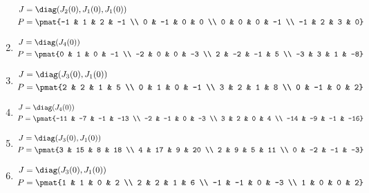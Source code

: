 \begin{enumerate}
\begin{align*}
J &= \diag(J_{2}(0), J_{1}(0), J_{1}(0))\\
P &= \pmat{-1 & 1 & 2 & -1 \\ 0 & -1 & 0 & 0 \\ 0 & 0 & 0 & -1 \\ -1 & 2 & 3 & 0}
\end{align*}

\item

\begin{align*}
J &= \diag(J_{4}(0))\\
P &= \pmat{0 & 1 & 0 & -1 \\ -2 & 0 & 0 & -3 \\ 2 & -2 & -1 & 5 \\ -3 & 3 & 1 & -8}
\end{align*}

\item

\begin{align*}
J &= \diag(J_{3}(0), J_{1}(0))\\
P &= \pmat{2 & 2 & 1 & 5 \\ 0 & 1 & 0 & -1 \\ 3 & 2 & 1 & 8 \\ 0 & -1 & 0 & 2}
\end{align*}

\item

\begin{align*}
J &= \diag(J_{4}(0))\\
P &= \pmat{-11 & -7 & -1 & -13 \\ -2 & -1 & 0 & -3 \\ 3 & 2 & 0 & 4 \\ -14 & -9 & -1 & -16}
\end{align*}

\item

\begin{align*}
J &= \diag(J_{3}(0), J_{1}(0))\\
P &= \pmat{3 & 15 & 8 & 18 \\ 4 & 17 & 9 & 20 \\ 2 & 9 & 5 & 11 \\ 0 & -2 & -1 & -3}
\end{align*}

\item

\begin{align*}
J &= \diag(J_{3}(0), J_{1}(0))\\
P &= \pmat{1 & 1 & 0 & 2 \\ 2 & 2 & 1 & 6 \\ -1 & -1 & 0 & -3 \\ 1 & 0 & 0 & 2}
\end{align*}


\end{enumerate}
